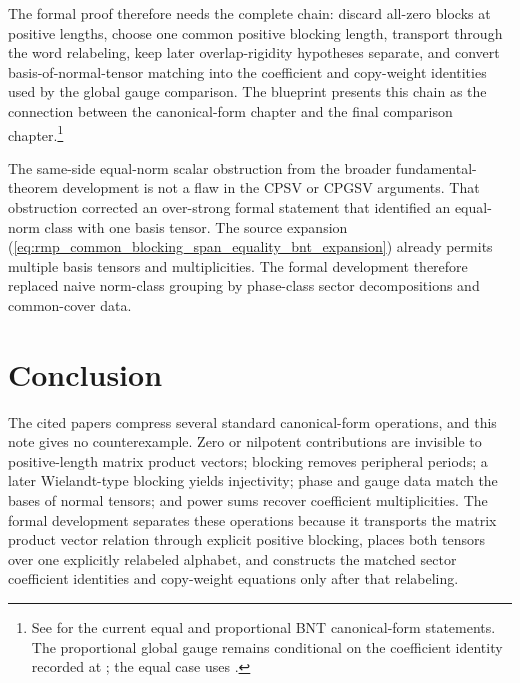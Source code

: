 \documentclass{article}
\begin{document}
The formal proof therefore needs the complete chain: discard all-zero blocks at
positive lengths, choose one common positive blocking length, transport through
the word relabeling, keep later overlap-rigidity hypotheses separate, and
convert basis-of-normal-tensor matching into the coefficient and copy-weight
identities used by the global gauge comparison. The blueprint presents this
chain as the connection between the canonical-form chapter and the final
comparison chapter.\footnote{See
 for the
current equal and proportional BNT canonical-form statements. The proportional
global gauge remains conditional on the coefficient identity recorded at
; the
equal case uses
.}

The same-side equal-norm scalar obstruction from the broader
fundamental-theorem development is not a flaw in the CPSV or CPGSV arguments.
That obstruction corrected an over-strong formal statement that identified an
equal-norm class with one basis tensor. The source expansion
(\ref{eq:rmp_common_blocking_span_equality_bnt_expansion}) already permits
multiple basis tensors and multiplicities. The formal development therefore
replaced naive norm-class grouping by phase-class sector decompositions and
common-cover data.

\section{Conclusion}

The cited papers compress several standard canonical-form operations, and this
note gives no counterexample. Zero or nilpotent contributions are invisible to
positive-length matrix product vectors; blocking removes peripheral periods; a
later Wielandt-type blocking yields injectivity; phase and gauge data match the
bases of normal tensors; and power sums recover coefficient multiplicities.
The formal development separates these operations because it transports the
matrix product vector relation through explicit positive blocking, places both
tensors over one explicitly relabeled alphabet, and constructs the matched
sector coefficient identities and copy-weight equations only after that
relabeling.
\end{document}
